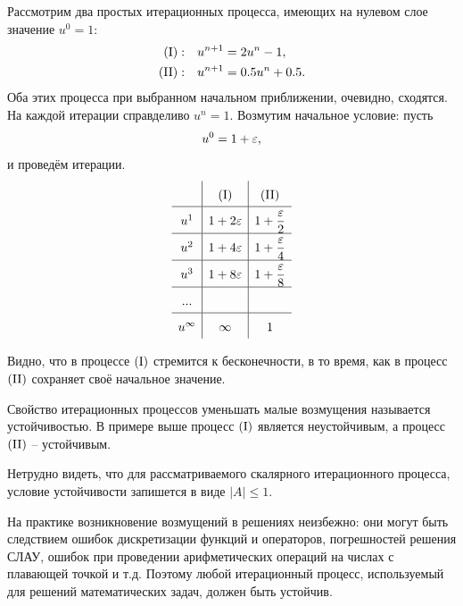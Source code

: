 \label{sec:ScalarIter}

Рассмотрим два простых итерационных процесса,
имеющих на нулевом слое значение $u^0 = 1$:
\begin{align*}
    {\rm (I)}:\quad  &u^{n+1} = 2 u^{n} - 1, \\
    {\rm (II)} :\quad  &u^{n+1} = 0.5 u^{n} + 0.5.
\end{align*}
Оба этих процесса при выбранном начальном приближении, очевидно, сходятся.
На каждой итерации справделиво $u^n = 1$.
Возмутим начальное условие: пусть
\begin{equation*}
    u^0 = 1 + \varepsilon,
\end{equation*}
и проведём итерации.
\begin{equation*}
    \def\arraystretch{1.7}
    \begin{array}{c|c|c}
        & {\rm (I)}  &  {\rm (II)} \\
        \hline
        u^1 & 1 + 2\eps & 1 + \dfrac{\eps}{2} \\
        \hline
        u^2 & 1 + 4\eps & 1 + \dfrac{\eps}{4} \\
        \hline
        u^3 & 1 + 8\eps & 1 + \dfrac{\eps}{8} \\
        \hline
        ... & & \\
        \hline
        u^\infty & \infty & 1 \\
    \end{array}
\end{equation*}

Видно, что в процессе $\rm (I)$  стремится к бесконечности,
в то время, как в процесс $\rm (II)$  сохраняет своё начальное значение.

Свойство итерационных процессов уменьшать малые возмущения называется устойчивостью.
В примере выше процесс $\rm (I)$ является неустойчивым, а процесс $\rm (II)$ -- устойчивым.

Нетрудно видеть, что для рассматриваемого скалярного итерационного процесса,
условие устойчивости запишется в виде $|A| \leq 1$.


На практике возникновение возмущений в решениях неизбежно:
они могут быть следствием ошибок дискретизации функций и операторов,
погрешностей решения СЛАУ, ошибок при проведении арифметических
операций на числах с плавающей точкой и т.д.
Поэтому любой итерационный процесс, используемый для решений
математических задач, должен быть устойчив.

